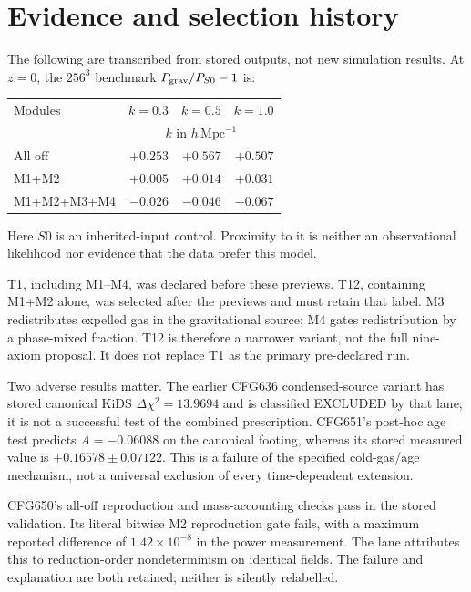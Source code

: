 \documentclass[11pt]{article}
\begin{document}
\section{Evidence and selection history}
The following are transcribed from stored outputs, not new simulation results. At $z=0$, the $256^3$ benchmark $P_{\rm grav}/P_{S0}-1$ is:
\begin{center}
\begin{tabular}{lrrr}
\toprule
Modules & $k=0.3$ & $k=0.5$ & $k=1.0$\\
 & \multicolumn{3}{c}{$k$ in $h\,\mathrm{Mpc}^{-1}$}\\
\midrule
All off & $+0.253$ & $+0.567$ & $+0.507$\\
M1+M2 & $+0.005$ & $+0.014$ & $+0.031$\\
M1+M2+M3+M4 & $-0.026$ & $-0.046$ & $-0.067$\\
\bottomrule
\end{tabular}
\end{center}
Here $S0$ is an inherited-input control. Proximity to it is neither an observational likelihood nor evidence that the data prefer this model.

T1, including M1--M4, was declared before these previews. T12, containing M1+M2 alone, was selected after the previews and must retain that label. M3 redistributes expelled gas in the gravitational source; M4 gates redistribution by a phase-mixed fraction. T12 is therefore a narrower variant, not the full nine-axiom proposal. It does not replace T1 as the primary pre-declared run.

Two adverse results matter. The earlier CFG636 condensed-source variant has stored canonical KiDS $\Delta\chi^2=13.9694$ and is classified EXCLUDED by that lane; it is not a successful test of the combined prescription. CFG651's post-hoc age test predicts $A=-0.06088$ on the canonical footing, whereas its stored measured value is $+0.16578\pm0.07122$. This is a failure of the specified cold-gas/age mechanism, not a universal exclusion of every time-dependent extension.

CFG650's all-off reproduction and mass-accounting checks pass in the stored validation. Its literal bitwise M2 reproduction gate fails, with a maximum reported difference of $1.42\times10^{-8}$ in the power measurement. The lane attributes this to reduction-order nondeterminism on identical fields. The failure and explanation are both retained; neither is silently relabelled.
\end{document}
